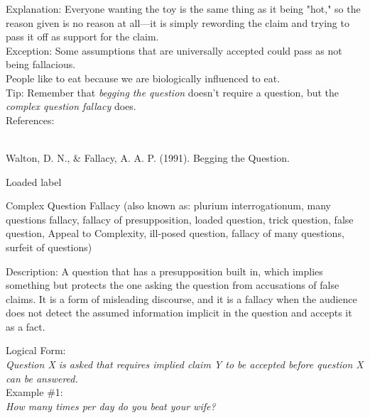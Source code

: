 \documentclass[a4paper,12pt,single,pdftex]{scrartcl}
\begin{document}
{    
      Explanation: Everyone wanting the toy is the same thing as it being "hot," so the reason given is no reason at all—it is simply rewording the claim and trying to pass it off as support for the claim.
    \\

    
      Exception: Some assumptions that are universally accepted could pass as not being fallacious.
    \\

    
      People like to eat because we are biologically influenced to eat.
    \\

    

    
      Tip: Remember that {\em begging the question} doesn’t require a question, but the {\it complex question fallacy} does.
    \\

    References:

    
      
        
      \\

      Walton, D. N., \& Fallacy, A. A. P. (1991). Begging the Question.
    
  }


Loaded label

Complex Question Fallacy
    (also known as: plurium interrogationum, many questions fallacy, fallacy of presupposition, loaded question, trick question, false question, Appeal to Complexity, ill-posed question, fallacy of many questions, surfeit of questions)
  
    Description: A question that has a presupposition built in, which implies something but protects the one asking the question from accusations of false claims.  It is a form of misleading discourse, and it is a fallacy when the audience does not detect the assumed information implicit in the question and accepts it as a fact.

    
      Logical Form:
    \\

    
      {\em Question X is asked that requires implied claim Y to be accepted before question X can be answered.}
    \\

    
      Example \#1:
    \\

    
      {\em How many times per day do you beat your wife?}
    \\
\end{document}
